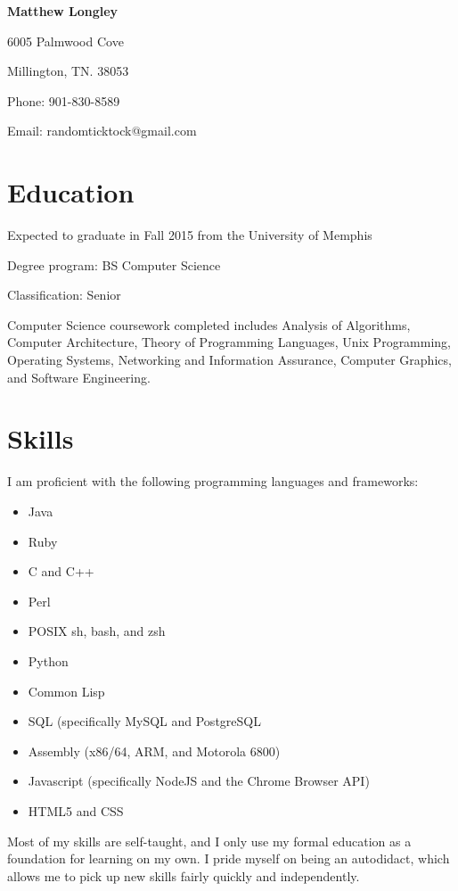 \documentclass{article}
\begin{document}
\begin{singlespace}
\begin{center}
  \textbf{Matthew Longley}
  
  6005 Palmwood Cove
  
  Millington, TN. 38053
  
  Phone: 901-830-8589
  
  Email: randomticktock@gmail.com
\end{center}
\begin{flushleft}
  \section*{Education}
  Expected to graduate in Fall 2015 from the University of Memphis

  Degree program: BS Computer Science

  Classification: Senior

  Computer Science coursework completed includes Analysis of Algorithms, Computer Architecture, Theory of Programming Languages, Unix Programming, Operating Systems, Networking and Information Assurance, Computer Graphics, and Software Engineering.
  \section*{Skills}
  I am proficient with the following programming languages and frameworks:
  \begin{itemize}
  \item Java
  \item Ruby
  \item C and C++
  \item Perl
  \item POSIX sh, bash, and zsh
  \item Python
  \item Common Lisp
  \item SQL (specifically MySQL and PostgreSQL
  \item Assembly (x86/64, ARM, and Motorola 6800)
  \item Javascript (specifically NodeJS and the Chrome Browser API)
  \item HTML5 and CSS
  \end{itemize}
  Most of my skills are self-taught, and I only use my formal education as a foundation for learning on my own. I pride myself on being an autodidact, which allows me to pick up new skills fairly quickly and independently.
\end{flushleft}
\end{singlespace}
\end{document}
